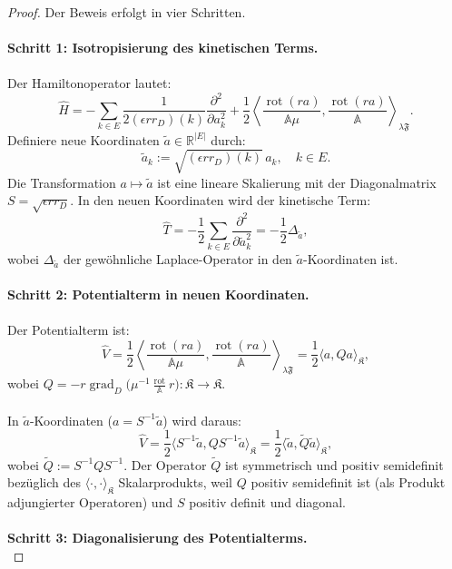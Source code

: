 \documentclass[11pt,a4paper,leqno]{report}
\numberwithin{equation}{chapter}
\begin{document}
\begin{proof}
	Der Beweis erfolgt in vier Schritten.\\
	\\
	\textbf{Schritt 1: Isotropisierung des kinetischen Terms.}\\
	\\
	Der Hamiltonoperator lautet:
	\[
	\hat{H} = -\sum_{k\in E} \frac{1}{2(\epsilon r r_D)(k)} \frac{\partial^2}{\partial a_k^2} 
	+ \frac{1}{2}\left\langle \frac{\operatorname{rot}(r a)}{\mathbb{A}\mu}, 
	\frac{\operatorname{rot}(r a)}{\mathbb{A}}\right\rangle_{\lambda\mathfrak{F}}.
	\]
	Definiere neue Koordinaten \(\tilde{a} \in \mathbb{R}^{|E|}\) durch:
	\[
	\tilde{a}_k := \sqrt{(\epsilon r r_D)(k)} \, a_k, \quad k \in E.
	\]
	Die Transformation \(a \mapsto \tilde{a}\) ist eine lineare Skalierung mit der 
	Diagonalmatrix \(S = \sqrt{\epsilon r r_D}\). In den neuen 
	Koordinaten wird der kinetische Term:
	\[
	\hat{T} = -\frac{1}{2}\sum_{k\in E} \frac{\partial^2}{\partial \tilde{a}_k^2} 
	= -\frac{1}{2}\Delta_{\tilde{a}},
	\]
	wobei \(\Delta_{\tilde{a}}\) der gewöhnliche Laplace-Operator in den \(\tilde{a}\)-Koordinaten ist.
	\\
	\\
	\textbf{Schritt 2: Potentialterm in neuen Koordinaten.}\\
	\\
	Der Potentialterm ist:
	\[
	\hat{V} = \frac{1}{2}\left\langle \frac{\operatorname{rot}(r a)}{\mathbb{A}\mu}, 
	\frac{\operatorname{rot}(r a)}{\mathbb{A}}\right\rangle_{\lambda\mathfrak{F}}
	= \frac{1}{2}\bigl\langle a, Q a\bigr\rangle_{\mathfrak{K}},
	\]
	wobei \(Q = -r\operatorname{grad}_D\bigl(\mu^{-1}\frac{\operatorname{rot}}{\mathbb{A}}r\bigr): \mathfrak{K} \to \mathfrak{K}\).\\
	\\
	In \(\tilde{a}\)-Koordinaten (\(a = S^{-1}\tilde{a}\)) wird daraus:
	\[
	\hat{V} = \frac{1}{2}\bigl\langle S^{-1}\tilde{a}, Q S^{-1}\tilde{a}\bigr\rangle_{\mathfrak{K}}
	= \frac{1}{2}\bigl\langle \tilde{a}, \tilde{Q} \tilde{a}\bigr\rangle_{\mathfrak{K}},
	\]
	wobei \(\tilde{Q} := S^{-1} Q S^{-1}\). Der Operator \(\tilde{Q}\) ist symmetrisch und positiv 
	semidefinit bezüglich des $\langle \cdot,\cdot\rangle_\mathfrak{K}$ Skalarprodukts, weil \(Q\) positiv semidefinit ist (als Produkt adjungierter Operatoren) 
	und \(S\) positiv definit und diagonal.\\
	\\
	\textbf{Schritt 3: Diagonalisierung des Potentialterms.}\\

\end{proof}
\end{document}
